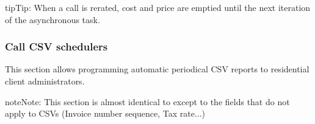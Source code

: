 \documentclass[letterpaper,10pt,english]{sphinxmanual}
\begin{document}
\begin{notice}{tip}{Tip:}
When a call is rerated, cost and price are emptied until the next iteration of the asynchronous task.
\end{notice}


\subsubsection{Call CSV schedulers}
\label{administration_portal/client/residential/calls/call_csv_schedulers:call-csv-schedulers}\label{administration_portal/client/residential/calls/call_csv_schedulers::doc}
This section allows programming automatic periodical CSV reports to residential client administrators.

\begin{notice}{note}{Note:}
This section is almost identical to {\hyperref[administration_portal/brand/invoicing/invoice_schedulers:invoice\string-schedulers]{}} except to the
fields that do not apply to CSVs (Invoice number sequence, Tax rate...)
\end{notice}
\end{document}

